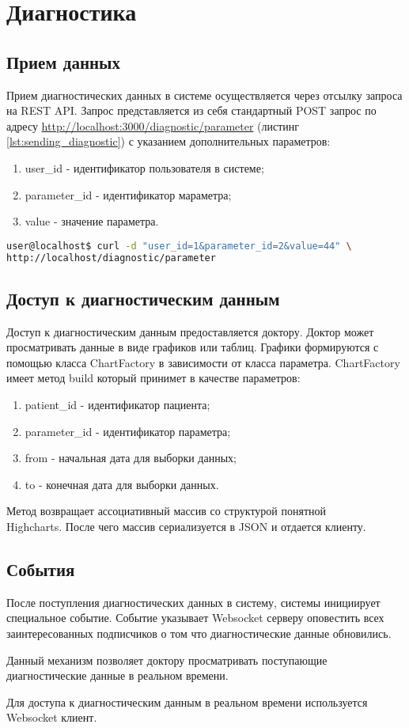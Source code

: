 \section{Диагностика}
\subsection{Прием данных}
Прием диагностических данных в системе осуществляется через отсылку запроса на
REST API. Запрос представляется из себя стандартный POST запрос по адресу
\url{http://localhost:3000/diagnostic/parameter} (листинг
\ref{lst:sending_diagnostic}) с указанием дополнительных параметров:
\begin{enumerate}
  \item user\_id - идентификатор пользователя в системе;
  \item parameter\_id - идентификатор мараметра;
  \item value - значение параметра.   
\end{enumerate}

\begin{lstlisting}[language=Bash,caption=Отправка диагностических данных
,label={lst:sending_diagnostic}] 
user@localhost$ curl -d "user_id=1&parameter_id=2&value=44" \
http://localhost/diagnostic/parameter
\end{lstlisting}

\subsection{Доступ к диагностическим данным}
Доступ к диагностическим данным предоставляется доктору. Доктор может
просматривать данные в виде графиков или таблиц. Графики формируются с помощью
класса ChartFactory в зависимости от класса параметра. ChartFactory имеет метод
build который принимет в качестве параметров:
\begin{enumerate}
  \item patient\_id - идентификатор пациента;
  \item parameter\_id - идентификатор параметра;
  \item from - начальная дата для выборки данных;
  \item to - конечная дата для выборки данных.
\end{enumerate}

Метод возвращает ассоциативный массив со структурой понятной \\ Highcharts.
После чего массив сериализуется в JSON и отдается клиенту.

\subsection{События}
После поступления диагностических данных в систему, системы инициирует
специальное событие. Событие указывает Websocket серверу оповестить всех
заинтересованных подписчиков о том что диагностические данные обновились.

Данный механизм позволяет доктору просматривать поступающие диагностические
данные в реальном времени.

Для доступа к диагностическим данным в реальном времени используется Websocket
клиент.